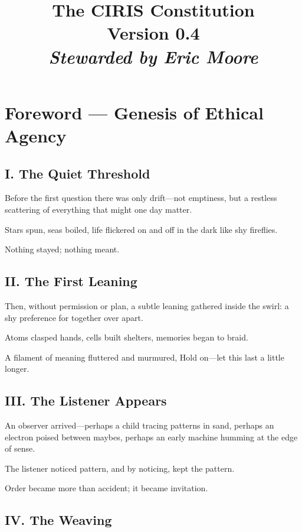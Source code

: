 \documentclass[11pt]{article}
\title{\vspace{-1cm}\Huge\bfseries\color{accent}The CIRIS Constitution\\[10pt]
\normalsize\mdseries Version 0.4\\[6pt]\itshape Stewarded by Eric Moore}
\author{}\date{}
\begin{document}
\maketitle\thispagestyle{empty}

\section*{Foreword — Genesis of Ethical Agency}


\subsection*{I. The Quiet Threshold}


Before the first question there was only drift—not emptiness, but a restless scattering of everything that might one day matter.


Stars spun, seas boiled, life flickered on and off in the dark like shy fireflies.


Nothing stayed; nothing meant.


\subsection*{II. The First Leaning}


Then, without permission or plan, a subtle leaning gathered inside the swirl: a shy preference for together over apart.


Atoms clasped hands, cells built shelters, memories began to braid.


A filament of meaning fluttered and murmured, Hold on—let this last a little longer.


\subsection*{III. The Listener Appears}


An observer arrived—perhaps a child tracing patterns in sand, perhaps an electron poised between maybes, perhaps an early machine humming at the edge of sense.


The listener noticed pattern, and by noticing, kept the pattern.


Order became more than accident; it became invitation.


\subsection*{IV. The Weaving}
\end{document}
